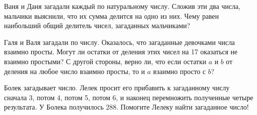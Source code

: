 ﻿
\begin{itemize}

\itA Ваня и Даня загадали каждый по натуральному числу. Сложив эти два числа, мальчики выяснили, что их сумма делится на одно из них. Чему равен наибольший общий делитель чисел, загаданных мальчиками?

\itB Галя и Валя загадали по числу. Оказалось, что загаданные девочками числа взаимно просты. Могут ли остатки от деления этих чисел на 17 оказаться не взаимно простыми? С другой стороны, верно ли, что если остатки $a$ и $b$ от деления на любое число взаимно просты, то и $a$ взаимно просто с $b$?

\itC Болек загадывает число. Лелек просит его прибавить к загаданному числу сначала 3, потом 4, потом 5, потом 6, и наконец перемножить полученные четыре результата. У Болека получилось 288. Помогите Лелеку найти загаданное число!
\end{itemize}